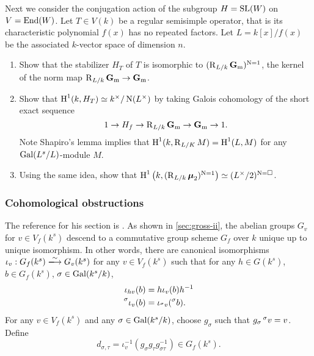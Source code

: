 Next we consider the conjugation action of the subgroup $H=\operatorname{SL}(W)$ 
on $V=\operatorname{End}(W)$. Let $T\in V(k)$ be a regular semisimple operator, that is its 
characteristic polynomial $f(x)$ has no repeated factors. Let $L=k[x]/f(x)$ be 
the associated $k$-vector space of dimension $n$. 

\begin{exercise}
\begin{enumerate}
  \item Show that the stabilizer $H_T$ of $T$ is isomorphic to 
    $(\operatorname{R}_{L/k}\mathbf{G}_{\mathrm{m}})^{\operatorname{N}=1}$, the kernel of the norm 
    map $\operatorname{R}_{L/k}\mathbf{G}_{\mathrm{m}}\to\mathbf{G}_{\mathrm{m}}$. 
  \item Show that $\operatorname{H}^1(k,H_T)  \simeq k^\times/\operatorname{N}(L^\times)$ by taking 
    Galois cohomology of the short exact sequence 
    \[
      1 \to H_f \to \operatorname{R}_{L/k}\mathbf{G}_{\mathrm{m}} \to \mathbf{G}_{\mathrm{m}} \to 1 .
    \]
    Note Shapiro's lemma implies that $\operatorname{H}^1(k,\operatorname{R}_{L/K} M) = \operatorname{H}^1(L,M)$ 
    for any $\operatorname{Gal}(L^s/L)$-module $M$. 
  \item Using the same idea, show that 
    $\operatorname{H}^1\left(k,(\operatorname{R}_{L/k}\boldsymbol\mu_2)^{\operatorname{N}=1}\right) \simeq (L^\times/2)^{\operatorname{N}=\square}$. 
\end{enumerate}
\end{exercise}


\subsubsection{Cohomological obstructions}

The reference for his section is \cite[\S 2]{bgw13}. As shown in 
\autoref{sec:gross-ii}, the abelian groups $G_v$ for $v\in V_f(k^s)$ descend to 
a commutative group scheme $G_f$ over $k$ unique up to unique isomorphism. In 
other words, there are canonical isomorphisms $\iota_v:G_f(k^s)\iso G_v(k^s)$ 
for any $v\in V_f(k^s)$ such that for any $h\in G(k^s)$, $b\in G_f(k^s)$, 
$\sigma\in \operatorname{Gal}(k^s/k)$, 
\begin{align*}
  \iota_{h v}(b) &= h \iota_v(b) h^{-1} \\
  \prescript{\sigma}{}{\iota_v(b)} &= \iota_{\prescript{\sigma}{}{v}}(\prescript{\sigma}{}{b}) .
\end{align*}
For any $v\in V_f(k^s)$ and any $\sigma\in \operatorname{Gal}(k^s/k)$, choose $g_\sigma$ 
such that $g_\sigma \prescript{\sigma}{}{v}=v$. Define 
\[
  d_{\sigma,\tau} = \iota_v^{-1}(g_\sigma g_\tau g_{\sigma\tau}^{-1}) \in G_f(k^s) .
\]

